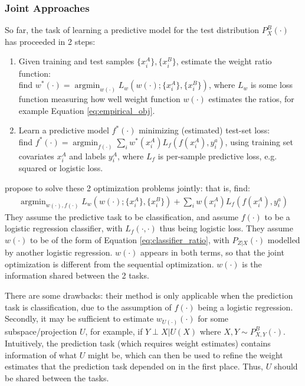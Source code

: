 \documentclass[8pt]{article}
\begin{document}
\subsubsection{Joint Approaches}\label{sec:joint}
So far, the task of learning a predictive model for the test
distribution $P_X^B(\cdot)$ has proceeded in 2 steps: 
\begin{enumerate}
\setlength\itemsep{0em}
\item Given training
and test samples $\{x_i^A\},\{x_i^B\}$, estimate the weight ratio
function: \\find
$w^*(\cdot) = \operatorname{argmin}_{w(\cdot)}L_w(w(\cdot);\{x_i^A\},\{x_i^B\})$,
where $L_w$ is some loss function measuring how well weight function
$w(\cdot)$ estimates the ratios, for example Equation \ref{eq:empirical_obj}.
\item Learn a predictive model $f^*(\cdot)$ minimizing (estimated) test-set loss:\\ find $f^*(\cdot)=\operatorname{argmin}_{f(\cdot)} \sum_i w^*(x_i^A)
  L_f(f(x_i^A),y_i^a)$, using
  training set covariates $x_i^A$ and labels $y_i^A$, where $L_f$ is per-sample predictive
  loss, e.g. squared or logistic loss.
\end{enumerate}
\cite{bickel2007discriminative} propose to solve these 2 optimization
problems jointly: that is, find:
\begin{align}
\operatorname{argmin}_{w(\cdot),f(\cdot)}
L_w(w(\cdot);\{x_i^A\},\{x_i^B\}) + \sum_i w(x_i^A)
  L_f(f(x_i^A),y_i^a) \label{eq:joint_bickel}
\end{align}
They assume the predictive task to be classification, and assume
$f(\cdot)$ to be a logistic regression classifier, with
$L_f(\cdot,\cdot)$ thus being logistic loss.  They assume $w(\cdot)$
to be of the form of Equation \ref{eq:classifier_ratio}, with $P_{Z|X}(\cdot)$
modelled by another logistic regression.  $w(\cdot)$ appears in both
terms, so that the joint optimization is different from the sequential
optimization.  $w(\cdot)$ is the information shared between the 2 tasks.

There are some drawbacks: their method is only applicable when the
prediction task is classification, due to the assumption of $f(\cdot)$
being a logistic regression.  Secondly, it may be sufficient to
estimate $w_{U(\cdot)}(\cdot)$ for some subspace/projection $U$, for
example, if 
$Y\perp X | U(X)$ where $X,Y
\sim P_{X,Y}^B(\cdot)$.  Intuitively, the prediction task (which
requires weight estimates)
contains information of what $U$ might be, which can then be used to
refine the weight estimates that the prediction task depended on in
the first place.  Thus, $U$ should be shared between the tasks.
\end{document}
